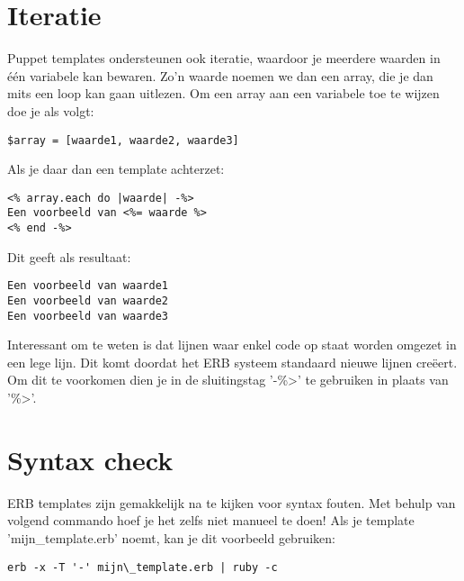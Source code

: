 \section{Iteratie}
Puppet templates ondersteunen ook iteratie, waardoor je meerdere waarden in \'{e}\'{e}n variabele kan bewaren. Zo'n waarde noemen we dan een array, die je dan mits een loop kan gaan uitlezen. Om een array aan een variabele toe te wijzen doe je als volgt:
%
\begin{code}
\begin{lstlisting}
$array = [waarde1, waarde2, waarde3]
\end{lstlisting}
\end{code}
%
Als je daar dan een template achterzet:
%
\begin{code}
\begin{lstlisting}
<% array.each do |waarde| -%>
Een voorbeeld van <%= waarde %>
<% end -%>
\end{lstlisting}
\end{code}
%
Dit geeft als resultaat:
%
\begin{code}
\begin{lstlisting}
Een voorbeeld van waarde1
Een voorbeeld van waarde2
Een voorbeeld van waarde3
\end{lstlisting}
\end{code}
%
Interessant om te weten is dat lijnen waar enkel code op staat worden omgezet in een lege lijn. Dit komt doordat het ERB systeem standaard nieuwe lijnen cre\"{e}ert. Om dit te voorkomen dien je in de sluitingstag '-\%>' te gebruiken in plaats van '\%>'.
%
\section{Syntax check}
ERB templates zijn gemakkelijk na te kijken voor syntax fouten. Met behulp van volgend commando hoef je het zelfs niet manueel te doen! Als je template 'mijn\_template.erb' noemt, kan je dit voorbeeld gebruiken:
%
\begin{code}
\begin{lstlisting}
erb -x -T '-' mijn\_template.erb | ruby -c
\end{lstlisting}
\end{code}
